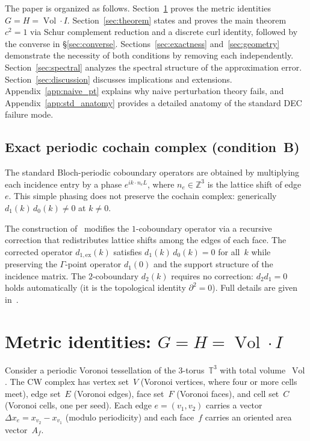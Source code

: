 \documentclass[preprint,12pt]{elsarticle}
\DeclareMathOperator{\Vol}{Vol}
\begin{document}
The paper is organized as follows. Section~\ref{sec:metric} proves the
metric identities $G = H = \Vol \cdot I$.
Section~\ref{sec:theorem} states and proves the main theorem $c^2 = 1$ via
Schur complement reduction and a discrete curl identity, followed by the
converse in \S\ref{sec:converse}.
Sections~\ref{sec:exactness} and~\ref{sec:geometry} demonstrate the
necessity of both conditions by removing each independently.
Section~\ref{sec:spectral} analyzes the spectral structure of the
approximation error. Section~\ref{sec:discussion} discusses implications
and extensions. Appendix~\ref{app:naive_pt} explains why naive perturbation
theory fails, and Appendix~\ref{app:std_anatomy} provides a detailed anatomy
of the standard DEC failure mode.


\subsection{Exact periodic cochain complex (condition~B)}
\label{sec:exact_complex}

The standard Bloch-periodic coboundary operators are obtained by
multiplying each incidence entry by a phase $e^{ik \cdot n_e L}$, where
$n_e \in \mathbb{Z}^3$ is the lattice shift of edge~$e$. This simple
phasing does not preserve the cochain complex: generically
$d_1(k)\, d_0(k) \neq 0$ at $k \neq 0$.

The construction of~\cite{paper1} modifies the $1$-coboundary operator
via a recursive correction that redistributes lattice shifts among the
edges of each face. The corrected operator $d_{1,\mathrm{ex}}(k)$
satisfies $d_1(k)\, d_0(k) = 0$ for all~$k$ while preserving the
$\Gamma$-point operator $d_1(0)$ and the support structure of the
incidence matrix. The $2$-coboundary $d_2(k)$ requires no correction:
$d_2 d_1 = 0$ holds automatically (it is the topological identity
$\partial^2 = 0$). Full details are given in~\cite{paper1}.


\section{Metric identities: $G = H = \Vol \cdot I$}
\label{sec:metric}

Consider a periodic Voronoi tessellation of the 3-torus~$\mathbb{T}^3$ with
total volume~$\Vol$. The CW complex has vertex set~$V$ (Voronoi vertices,
where four or more cells meet), edge set~$E$ (Voronoi edges), face set~$F$
(Voronoi faces), and cell set~$C$ (Voronoi cells, one per seed). Each edge
$e = (v_1, v_2)$ carries a vector $\Delta x_e = x_{v_2} - x_{v_1}$
(modulo periodicity) and each face~$f$ carries an oriented area
vector~$A_f$.
\end{document}
